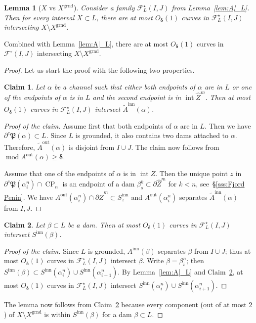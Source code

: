 \documentclass{amsart}
\newcommand{\1}{{\mathbb 1 }}
\newcommand{\Fam}{{\mathcal F}}
\newcommand\intr{\operatorname{int}}
\newcommand{\wZ}{{\widehat Z}}
\newcommand{\str}{{\star}}
\newcommand\inn{{\operatorname{inn}}}
\newcommand\out{{\operatorname{out}}}
\newcommand{\grnd}{{\operatorname{grnd}}}
\newtheorem{claim6}{Claim}
\newtheorem{lem}[thm]{Lemma}
\theoremstyle{remark}
\numberwithin{equation}{section}
\theoremstyle{definition}
\renewcommand{\mod}{\operatorname{mod}}
\newcommand{\Penin}{{\mathfrak P}}
\newcommand{\CP}{{\operatorname{CP}}}
\newcommand{\bdelta}{{\boldsymbol{ \delta}}}
\begin{document}
\begin{lem}[$X$ vs $X^\grnd$]
\label{lem:I vs I^grnd} Consider a family $\Fam^\str_L(I,J)$ from Lemma~\ref{lem:A|_L}. Then for every interval $X\subset L$, there are at most $O_\bdelta(1)$ curves in $\Fam^\str_L(I,J)$ intersecting ${X\setminus X^\grnd}$. 
\end{lem}
\noindent Combined with Lemma~\ref{lem:A|_L}, there are at most $O_\bdelta(1)$ curves in $\Fam^\circ (I,J)$ intersecting ${X\setminus X^\grnd}$. 
\begin{proof}
Let us start the proof with the following two properties.
\begin{claim6} 
\label{cl6:1}
Let $\alpha$ be a channel such that either both endpoints of $\alpha$ are in $L$ or one of the endpoints of $\alpha$ is in $L$ and the second endpoint is in $\intr \wZ^m$. Then at most $O_\bdelta(1)$ curves in $\Fam^\str_L(I,J)$ intersect $\widetilde A^\inn(\alpha)$. 
\end{claim6}
\begin{proof}[Proof of the claim]
Assume first that both endpoints of $\alpha$ are in $L$. Then we have $\partial^c\Penin(\alpha)\subset L$. Since $L$ is grounded, it also contains two dams attached to $\alpha$. Therefore, $\widetilde A^\out(\alpha)$ is disjoint from $I\cup J$. The claim now follows from $\mod  A^\out(\alpha)\ge \bdelta$.

Assume that one of the endpoints of $\alpha$ is in $\intr Z$. Then the unique point $z$ in $\partial^c\Penin (\alpha^n_i)\cap \CP_n$ is an endpoint of a dam $\beta^k_s\subset \partial \wZ^m$ for $k<n$, see~\S\ref{sss:Fjord Penin}. We have $A^\out(\alpha^n_i)\cap \partial \wZ^m\subset S^\inn_z$ and $A^\out(\alpha^n_i)$ separates $\widetilde A^\inn(\alpha)$ from $I,J$.
\end{proof}

\begin{claim6} 
\label{cl6:2}
Let $\beta\subset L$ be a dam. Then at most $O_\bdelta(1)$ curves in $\Fam^\str_L(I,J)$ intersect $ S^\inn(\beta)$. 
\end{claim6}
\begin{proof}[Proof of the claim]
Since $L$ is grounded, $A^\inn(\beta)$ separates $\beta$ from $I\cup J$; thus at most $O_\bdelta(1)$ curves in $\Fam^\str_L(I,J)$ intersect $\beta$. Write $\beta=\beta^n_i$; then $S^\inn(\beta)\subset S^{\inn}(\alpha^n_{i})\cup S^{\inn}(\alpha^n_{i+1})$. By Lemma~\ref{lem:A|_L} and Claim~\ref{cl6:2}, at most $O_\bdelta(1)$ curves in $\Fam^\str_L(I,J)$ intersect $S^{\inn}(\alpha^n_{i})\cup  S^{\inn}(\alpha^n_{i+1})$.
\end{proof}

The lemma now follows from Claim~\ref{cl6:2} because every component (out of at most $2$) of ${X\setminus X^\grnd}$ is within $ S^\inn(\beta)$ for a dam $\beta\subset L$.
 \end{proof}
\end{document}
